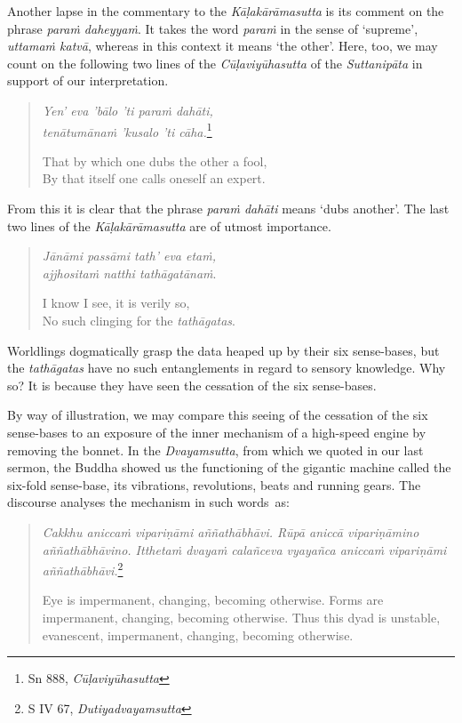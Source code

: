 Another lapse in the commentary to the \emph{Kāḷakārāmasutta} is its comment on the phrase \emph{paraṁ daheyyaṁ}. It takes the word \emph{paraṁ} in the sense of `supreme', \emph{uttamaṁ katvā}, whereas in this context it means `the other'. Here, too, we may count on the following two lines of the \emph{Cūḷaviyūhasutta} of the \emph{Suttanipāta} in support of our interpretation.

\begin{quote}
\emph{Yen' eva 'bālo 'ti paraṁ dahāti,}\\
\emph{tenātumānaṁ 'kusalo 'ti cāha.}\footnote{Sn 888, \emph{Cūḷaviyūhasutta}}

That by which one dubs the other a fool,\\
By that itself one calls oneself an expert.
\end{quote}

From this it is clear that the phrase \emph{paraṁ dahāti} means `dubs another'. The last two lines of the \emph{Kāḷakārāmasutta} are of utmost importance.

\begin{quote}
\emph{Jānāmi passāmi tath' eva etaṁ,}\\
\emph{ajjhositaṁ natthi tathāgatānaṁ}.

I know I see, it is verily so,\\
No such clinging for the \emph{tathāgatas}.
\end{quote}

Worldlings dogmatically grasp the data heaped up by their six sense-bases, but the \emph{tathāgatas} have no such entanglements in regard to sensory knowledge. Why so? It is because they have seen the cessation of the six sense-bases.

By way of illustration, we may compare this seeing of the cessation of the six sense-bases to an exposure of the inner mechanism of a high-speed engine by removing the bonnet. In the \emph{Dvayamsutta}, from which we quoted in our last sermon, the Buddha showed us the functioning of the gigantic machine called the six-fold sense-base, its vibrations, revolutions, beats and running gears. The discourse analyses the mechanism in such words~as:

\begin{quote}
\emph{Cakkhu aniccaṁ vipariṇāmi aññathābhāvi. Rūpā aniccā vipariṇāmino aññathābhāvino. Itthetaṁ dvayaṁ calañceva vyayañca aniccaṁ vipariṇāmi aññathābhāvi.}\footnote{S IV 67, \emph{Dutiyadvayamsutta}}

Eye is impermanent, changing, becoming otherwise. Forms are impermanent, changing, becoming otherwise. Thus this dyad is unstable, evanescent, impermanent, changing, becoming otherwise.
\end{quote}

